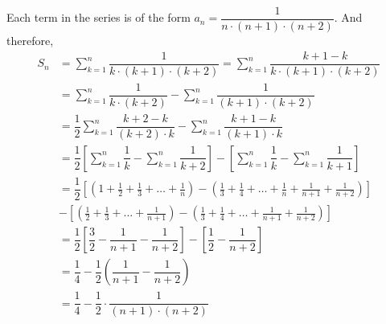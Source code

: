 \begin{solution}
	\begin{fullwidth}
	Each term in the series is of the form $a_n = \dfrac{1}{n\cdot(n+1)\cdot(n+2)}$. And therefore,
	\begin{align}
		S_n &= \sum_{k=1}^{n}\dfrac{1}{k\cdot(k+1)\cdot(k+2)} 
		= \sum_{k=1}^{n}\dfrac{k+1-k}{k\cdot(k+1)\cdot(k+2)} \\
		&= \sum_{k=1}^{n}\dfrac{1}{k\cdot(k+2)} - \sum_{k=1}^{n}\dfrac{1}{(k+1)\cdot(k+2)} \\
		&= \dfrac{1}{2}\sum_{k=1}^{n}\dfrac{k+2-k}{(k+2)\cdot k} - \sum_{k=1}^{n}\dfrac{k+1-k}{(k+1)\cdot k} \\
		&= \dfrac{1}{2}\left[\sum_{k=1}^{n}\dfrac{1}{k} - \sum_{k=1}^{n}\dfrac{1}{k+2} \right] 
		- \left[ \sum_{k=1}^{n}\dfrac{1}{k} - \sum_{k=1}^{n}\dfrac{1}{k+1} \right] \\
		&= \dfrac{1}{2}\left[\left(1 + \frac{1}{2} + \frac{1}{3} + \ldots + \frac{1}{n} \right) 
		- \left( \frac{1}{3} + \frac{1}{4} + \ldots + \frac{1}{n} + \frac{1}{n+1} + \frac{1}{n+2}\right) 
		\right] \nonumber \\
		&- \left[\left( \frac{1}{2} + \frac{1}{3} + \ldots + \frac{1}{n+1}\right) 
		- \left( \frac{1}{3} + \frac{1}{4} + \ldots + \frac{1}{n+1} + \frac{1}{n+2} \right) \right]  \\
		&= \dfrac{1}{2}\left[ \dfrac{3}{2} - \dfrac{1}{n+1} - \dfrac{1}{n+2}\right] 
		- \left[\dfrac{1}{2} - \dfrac{1}{n+2} \right] \\
		&= \dfrac{1}{4} - \dfrac{1}{2}\left( \dfrac{1}{n+1} - \dfrac{1}{n+2}\right) \\
		&= \dfrac{1}{4} - \dfrac{1}{2}\cdot\dfrac{1}{(n+1)\cdot(n+2)}
	\end{align}
	\end{fullwidth}
\end{solution}
